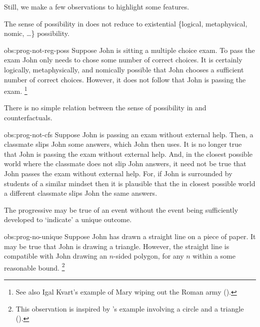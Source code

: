 \begin{note}
  Still, we make a few observations to highlight some features.

  \begin{observation}%
    \label{obs:prog-not-reg-poss}%
    The sense of possibility in \assuPP{} does not reduce to existential \{logical, metaphysical, nomic, \dots\} possibility.
  \end{observation}
  \begin{motivation}{obs:prog-not-reg-poss}
    Suppose John is sitting a multiple choice exam.
    To pass the exam John only needs to chose some number of correct choices.
    It is certainly logically, metaphysically, and nomically possible that John chooses a sufficient number of correct choices.
    However, it does not follow that John is passing the exam.%
    \footnote{
      See also Igal Kvart's example of Mary wiping out the Roman army (\cite[18]{Landman:1992wh}).
    }
  \end{motivation}

  \begin{observation}%
    \label{obs:prog-not-cfs}%
    There is no simple relation between the sense of possibility in \assuPP{} and counterfactuals.
  \end{observation}
  \begin{motivation}{obs:prog-not-cfs}
    Suppose John is passing an exam without external help.
    Then, a classmate slips John some answers, which John then uses.
    It is no longer true that John is passing the exam without external help.
    And, in the closest possible world where the classmate does not slip John answers, it need not be true that John passes the exam without external help.
    For, if John is surrounded by students of a similar mindset then it is plausible that the in closest possible world a different classmate slips John the same answers.
  \end{motivation}

  \begin{observation}%
    \label{obs:prog-no-unique}%
    The progressive may be true of an event without the event being sufficiently developed to `indicate' a unique outcome.
  \end{observation}
  \begin{motivation}{obs:prog-no-unique}
    Suppose John has drawn a straight line on a piece of paper.
    It may be true that John is drawing a triangle.
    However, the straight line is compatible with John drawing an \(n\)-sided polygon, for any \(n\) within a some reasonable bound.%
    \footnote{
      This observation is inspired by \citeauthor{Dowty:1979vq}'s example involving a circle and a triangle (\citeyear[133]{Dowty:1979vq}).
    }
  \end{motivation}


\end{note}
